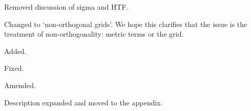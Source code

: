 \documentclass{article}
\begin{document}
\begin{quotation}
\begin{comment}
\item Line 106--111: This manuscript does not discuss or use pressure-based vertical coordinates at all, and the information about sigma and HTF is irrelevant.  Furthermore, the sigma definition is only correct for models with zero pressure at the model top.  Remove these lines.
\end{comment}
\end{quotation}
Removed discussion of sigma and HTF.

\begin{quotation}
\begin{comment}
\item Line 124: It is not clear what you mean by `unstructured grids'.  The grids seem to be very structured.  Clarify.
\end{comment}
\end{quotation}
Changed to `non-orthogonal grids'.  We hope this clarifies that the issue is the treatment of non-orthogonality: metric terms or the grid.

\begin{quotation}
\begin{comment}
\item Section 3: It would be helpful to point out up front that you use the model in a 2D x-z slice configuration without Coriolis forces.
\end{comment}
\end{quotation}
Added.

\begin{quotation}
\begin{comment}
\item Line 142: typo `\ldots temperature, \ldots'
\end{comment}
\end{quotation}
Fixed.

\begin{quotation}
\begin{comment}
\item Line 145: There is no `Lorenz C grid staggering', the model uses the C-grid staggering in the horizontal and the Lorenz grid in the vertical.
\end{comment}
\end{quotation}
Amended.

\begin{quotation}
\begin{comment}
\item Lines 145--160: This information is disconnected from the whole paper.  Expand the explanations to make them self-explanatory and move the paragraph into an appendix.  Clarify that this treatment is only needed for nonlinear flows and that the advection uses an explicit time-stepping scheme.
\end{comment}
\end{quotation}
Description expanded and moved to the appendix.
\end{document}
